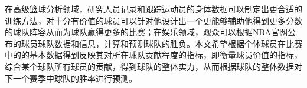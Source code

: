 

在高级篮球分析领域，研究人员记录和跟踪运动员的身体数据可以制定出更合适的训练方法，对十分有价值的球员可以针对他设计出一个更能够辅助他得到更多分数的球队阵容从而为球队赢得更多的比赛；在娱乐领域，观众可以根据NBA官网公布的球员球队数据和信息，计算和预测球队的胜负。本文希望根据个体球员在比赛中的的基本数据得到反映其对所在球队贡献程度的指标，即衡量球员价值的指标，综合某个球队所有球员的贡献，得到球队的整体实力，从而根据球队的整体数据对下一个赛季中球队的胜率进行预测。